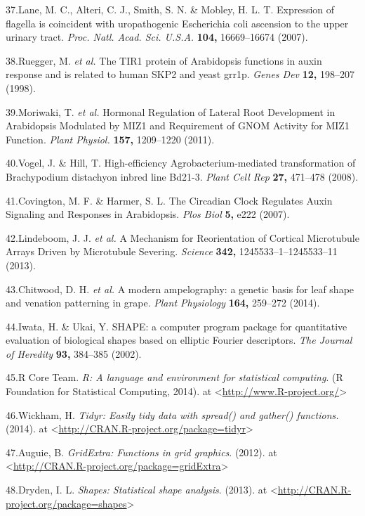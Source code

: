 \documentclass[]{article}
\begin{document}
37.Lane, M. C., Alteri, C. J., Smith, S. N. \& Mobley, H. L. T.
Expression of flagella is coincident with uropathogenic Escherichia coli
ascension to the upper urinary tract. \emph{Proc. Natl. Acad. Sci.
U.S.A.} \textbf{104,} 16669--16674 (2007).

38.Ruegger, M. \emph{et al.} The TIR1 protein of Arabidopsis functions
in auxin response and is related to human SKP2 and yeast grr1p.
\emph{Genes Dev} \textbf{12,} 198--207 (1998).

39.Moriwaki, T. \emph{et al.} Hormonal Regulation of Lateral Root
Development in Arabidopsis Modulated by MIZ1 and Requirement of GNOM
Activity for MIZ1 Function. \emph{Plant Physiol.} \textbf{157,}
1209--1220 (2011).

40.Vogel, J. \& Hill, T. High-efficiency Agrobacterium-mediated
transformation of Brachypodium distachyon inbred line Bd21-3.
\emph{Plant Cell Rep} \textbf{27,} 471--478 (2008).

41.Covington, M. F. \& Harmer, S. L. The Circadian Clock Regulates Auxin
Signaling and Responses in Arabidopsis. \emph{Plos Biol} \textbf{5,}
e222 (2007).

42.Lindeboom, J. J. \emph{et al.} A Mechanism for Reorientation of
Cortical Microtubule Arrays Driven by Microtubule Severing.
\emph{Science} \textbf{342,} 1245533--1--1245533--11 (2013).

43.Chitwood, D. H. \emph{et al.} A modern ampelography: a genetic basis
for leaf shape and venation patterning in grape. \emph{Plant Physiology}
\textbf{164,} 259--272 (2014).

44.Iwata, H. \& Ukai, Y. SHAPE: a computer program package for
quantitative evaluation of biological shapes based on elliptic Fourier
descriptors. \emph{The Journal of Heredity} \textbf{93,} 384--385
(2002).

45.R Core Team. \emph{R: A language and environment for statistical
computing}. (R Foundation for Statistical Computing, 2014). at
\textless{}\url{http://www.R-project.org/}\textgreater{}

46.Wickham, H. \emph{Tidyr: Easily tidy data with spread() and gather()
functions.} (2014). at
\textless{}\url{http://CRAN.R-project.org/package=tidyr}\textgreater{}

47.Auguie, B. \emph{GridExtra: Functions in grid graphics}. (2012). at
\textless{}\url{http://CRAN.R-project.org/package=gridExtra}\textgreater{}

48.Dryden, I. L. \emph{Shapes: Statistical shape analysis}. (2013). at
\textless{}\url{http://CRAN.R-project.org/package=shapes}\textgreater{}
\end{document}
